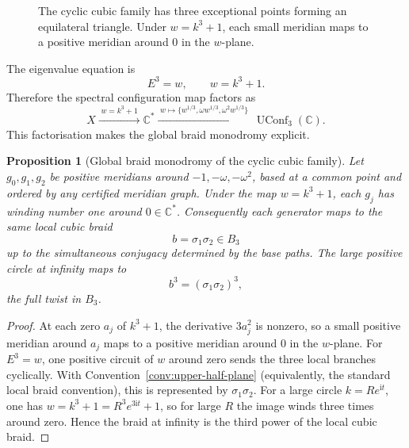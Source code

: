 \documentclass[11pt]{article}
\newtheorem{proposition}[theorem]{Proposition}
\numberwithin{equation}{section}
\DeclareMathOperator{\UConf}{UConf}
\newcommand{\bbC}{\mathbb C}
\newcommand{\ii}{\mathrm i}
\begin{document}
\begin{figure}[H]
\centering
{}
\caption{The cyclic cubic family has three exceptional points forming an
equilateral triangle.  Under $w=k^3+1$, each small meridian maps to a
positive meridian around $0$ in the $w$-plane.}
\label{fig:cyclic-three}
\end{figure}

The eigenvalue equation is
\[
  E^3=w,\qquad w=k^3+1.
\]
Therefore the spectral configuration map factors as
\[
  X\xrightarrow{\;w=k^3+1\;}\bbC^*
  \xrightarrow{\;w\mapsto\{w^{1/3},\omega w^{1/3},\omega^2w^{1/3}\}\;}
  \UConf_3(\bbC).
\]
This factorisation makes the global braid monodromy explicit.

\begin{proposition}[Global braid monodromy of the cyclic cubic family]
Let $g_0,g_1,g_2$ be positive meridians around
$-1,-\omega,-\omega^2$, based at a common point and ordered by any certified
meridian graph.  Under the map $w=k^3+1$, each $g_j$ has winding number one
around $0\in\bbC^*$.  Consequently each generator maps to the same local
cubic braid
\[
  b=\sigma_1\sigma_2\in B_3
\]
up to the simultaneous conjugacy determined by the base paths.  The large
positive circle at infinity maps to
\[
  b^3=(\sigma_1\sigma_2)^3,
\]
the full twist in $B_3$.
\end{proposition}

\begin{proof}
At each zero $a_j$ of $k^3+1$, the derivative $3a_j^2$ is nonzero, so a
small positive meridian around $a_j$ maps to a positive meridian around
$0$ in the $w$-plane.  For $E^3=w$, one positive circuit of $w$ around zero
sends the three local branches cyclically.  With Convention~\ref{conv:upper-half-plane}
(equivalently, the standard local braid convention), this is represented by
$\sigma_1\sigma_2$.  For a large circle
$k=Re^{\ii t}$, one has $w=k^3+1=R^3e^{3\ii t}+1$, so for large $R$ the
image winds three times around zero.  Hence the braid at infinity is the
third power of the local cubic braid.
\end{proof}
\end{document}
